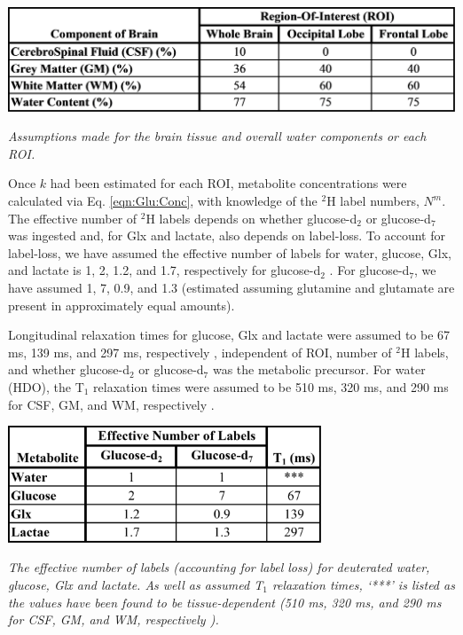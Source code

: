 \begin{table}[H]
    \centering
    \includegraphics[width = 1\textwidth]{Figures/Glucose/ROI_Table.png}
    \caption{\textit{Assumptions made for the brain tissue and overall water components or each \ac{ROI}.}}
    \label{fig:Glu:ROI}
\end{table}

Once $k$ had been estimated for each \ac{ROI}, metabolite concentrations were calculated via Eq. \ref{eqn:Glu:Conc}, with knowledge of the $^2$H label numbers, $N^m$. The effective number of $^2$H labels depends on whether glucose-d$_2$ or glucose-d$_7$ was ingested and, for Glx and lactate, also depends on label-loss. To account for label-loss, we have assumed the effective number of labels for water, glucose, Glx, and lactate is 1, 2, 1.2, and 1.7, respectively for glucose-d$_2$ \cite{DeGraaf2021CharacterizationStudies}. For glucose-d$_7$, we have assumed 1, 7, 0.9, and 1.3 (estimated \cite{Funk2017TheGlucose} assuming glutamine and glutamate are present in approximately equal amounts). 

Longitudinal relaxation times for glucose, Glx and lactate were assumed to be 67 ms, 139 ms, and 297 ms, respectively \cite{DeFeyter2018DeuteriumVivo}, independent of \ac{ROI}, number of $^2$H labels, and whether glucose-d$_2$ or glucose-d$_7$ was the metabolic precursor. For water (\ac{HDO}), the T$_1$ relaxation times were assumed to be 510 ms, 320 ms, and 290 ms for \ac{CSF}, \ac{GM}, and \ac{WM}, respectively \cite{Cocking2023DeuteriumDosing}.

\begin{table}[H]
    \centering
    \includegraphics[width = 0.7\textwidth]{Figures/Glucose/Metab_Table.png}
    \caption{\textit{The effective number of labels (accounting for label loss) for deuterated water, glucose, Glx and lactate. As well as assumed T$_1$ relaxation times, `***' is listed as the values have been found to be tissue-dependent (510 ms, 320 ms, and 290 ms for \ac{CSF}, \ac{GM}, and \ac{WM}, respectively \cite{Cocking2023DeuteriumDosing}).}}
    \label{fig:Glu:Metab}
\end{table}

